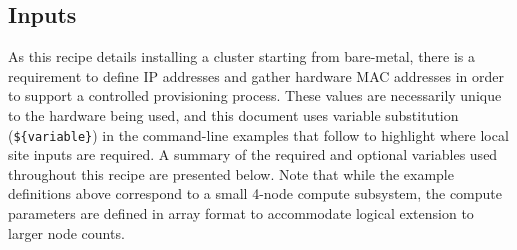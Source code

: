 
\subsection{Inputs} \label{sec:inputs}
As this recipe details installing a cluster starting from bare-metal, there is a requirement to define IP addresses and
gather hardware MAC addresses in order to support a controlled provisioning process. These values are necessarily unique
to the hardware being used, and this document uses variable substitution (\texttt{\$\{variable\}}) in the command-line
examples that follow to highlight where local site inputs are required. A summary of the required and optional variables
used throughout this recipe are presented below. Note that while the example definitions above correspond to a small
4-node compute subsystem, the compute parameters are defined in array format to accommodate logical extension to larger
node counts. \\

